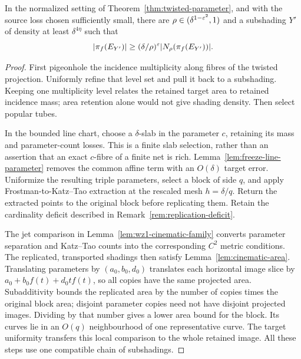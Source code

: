 \begin{lemma}
\label{lem:projection-one-step}
In the normalized setting of Theorem~\ref{thm:twisted-parameter},
and with the source loss chosen sufficiently small, there are
$\rho\in(\delta^{1-\varepsilon^2},1)$ and a subshading $Y'$ of density
at least $\delta^{4\eta}$ such that
\[
 |\pi_f(E_{Y'})|\geq(\delta/\rho)^\varepsilon
                         |N_\rho(\pi_f(E_{Y'}))|.
\]
\end{lemma}
\begin{proof}
First pigeonhole the incidence multiplicity along fibres of the
twisted projection. Uniformly refine that level set and pull it back
to a subshading. Keeping one multiplicity level relates the retained
target area to retained incidence mass; area retention alone would
not give shading density. Then select popular tubes.

In the bounded line chart, choose a $\delta$-slab in the parameter
$c$, retaining its mass and parameter-count losses. This is a finite
slab selection, rather than an assertion that an exact $c$-fibre of
a finite net is rich. Lemma~\ref{lem:freeze-line-parameter} removes
the common affine term with an $O(\delta)$ target error. Uniformize
the resulting triple parameters, select a block of side $q$, and
apply Frostman-to-Katz--Tao extraction at the rescaled mesh
$h=\delta/q$. Return the extracted points to the original block
before replicating them. Retain the cardinality deficit described in
Remark~\ref{rem:replication-deficit}.

The jet comparison in Lemma~\ref{lem:wz1-cinematic-family} converts
parameter separation and Katz--Tao counts into the corresponding
$C^2$ metric conditions. The replicated, transported shadings then
satisfy Lemma~\ref{lem:cinematic-area}. Translating parameters by
$(a_0,b_0,d_0)$ translates each horizontal image slice by
$a_0+b_0f(t)+d_0tf(t)$, so all copies have the same projected area.
Subadditivity bounds the replicated area by the number of copies
times the original block area; disjoint parameter copies need not
have disjoint projected images. Dividing by that number gives a
lower area bound for the block. Its curves lie in an $O(q)$
neighbourhood of one representative curve. The target uniformity
transfers this local comparison to the whole retained image.
All these steps use one compatible chain of subshadings.
\end{proof}


